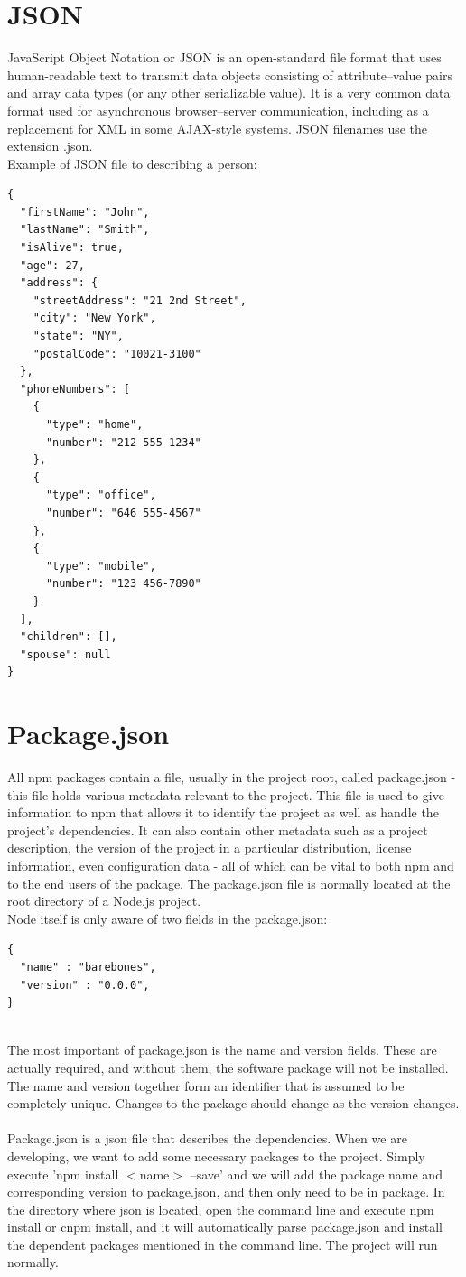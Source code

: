 \section{JSON}
JavaScript Object Notation or JSON is an open-standard file format that uses human-readable text to transmit data objects consisting of attribute–value pairs and array data types (or any other serializable value). It is a very common data format used for asynchronous browser–server communication, including as a replacement for XML in some AJAX-style systems. JSON filenames use the extension .json. \\ Example of JSON file to  describing a person:
\begin{verbatim}
{
  "firstName": "John",
  "lastName": "Smith",
  "isAlive": true,
  "age": 27,
  "address": {
    "streetAddress": "21 2nd Street",
    "city": "New York",
    "state": "NY",
    "postalCode": "10021-3100"
  },
  "phoneNumbers": [
    {
      "type": "home",
      "number": "212 555-1234"
    },
    {
      "type": "office",
      "number": "646 555-4567"
    },
    {
      "type": "mobile",
      "number": "123 456-7890"
    }
  ],
  "children": [],
  "spouse": null
}
\end{verbatim}
\section{Package.json}
All npm packages contain a file, usually in the project root, called package.json - this file holds various metadata relevant to the project\cite{9}. This file is used to give information to npm that allows it to identify the project as well as handle the project's dependencies. It can also contain other metadata such as a project description, the version of the project in a particular distribution, license information, even configuration data - all of which can be vital to both npm and to the end users of the package. The package.json file is normally located at the root directory of a Node.js project\cite{9}. \\ Node itself is only aware of two fields in the package.json:
\begin{verbatim}
{
  "name" : "barebones",
  "version" : "0.0.0",
}
\end{verbatim}
\\ The most important of package.json is the name and version fields\cite{9}. These are actually required, and without them, the software package will not be installed. The name and version together form an identifier that is assumed to be completely unique. Changes to the package should change as the version changes. \\ \\ Package.json is a json file that describes the dependencies. When we are developing, we want to add some necessary packages to the project. Simply execute 'npm install $<$name$>$ --save' and we will add the package name and corresponding version to package.json\cite{9}, and then only need to be in package. In the directory where json is located, open the command line and execute npm install or cnpm install, and it will automatically parse package.json and install the dependent packages mentioned in the command line. The project will run normally\cite{9}.


